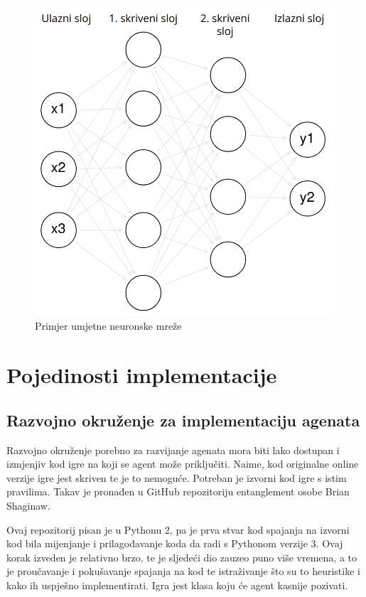 \documentclass[zavrsnirad]{fer}
\begin{document}
\begin{figure}[htb]
	\centering
	\includegraphics[width=0.58\linewidth]{Figures/neural.png} 
	\caption{Primjer umjetne neuronske mreže}
	\label{slk:prikaz_neuronske}
\end{figure}


\chapter{Pojedinosti implementacije}
\label{pog:glavni_dio2}

\section{Razvojno okruženje za implementaciju agenata}
\label{pog:razvojno_okruzenje}


Razvojno okruženje porebno za razvijanje agenata mora biti lako dostupan i izmjenjiv kod igre na koji se agent može priključiti. Naime, kod originalne online verzije igre jest skriven te je to nemoguće. Potreban je izvorni kod igre s istim pravilima. Takav je pronađen u GitHub repozitoriju \cite{entanglementgithub} entanglement osobe Brian Shaginaw.

Ovaj repozitorij pisan je u Pythonu 2, pa je prva stvar kod spajanja na izvorni kod bila mijenjanje i prilagođavanje koda da radi s Pythonom verzije 3. Ovaj korak izveden je relativno brzo, te je sljedeći dio zauzeo puno više vremena, a to je proučavanje i pokušavanje spajanja na kod te istraživanje što su to heuristike i kako ih uspješno implementirati. Igra jest klasa koju će agent kasnije pozivati.
\end{document}
